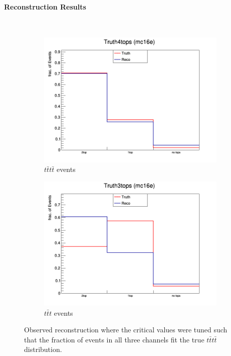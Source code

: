 \newpage

\paragraph{Reconstruction Results} \mbox{} \\


\begin{figure}[H]
\begin{subfigure}{.5\textwidth}
  \centering
  \includegraphics[width=.99\linewidth]{figs/HadTop/4topResult}
  \caption{$t\bar{t}t\bar{t}$ events}
  \label{fig:Reco4t}
\end{subfigure}%
\begin{subfigure}{.5\textwidth}
  \centering
  \includegraphics[width=.99\linewidth]{figs/HadTop/3topsResult}
  \caption{$t\bar{t}t$ events}
  \label{fig:Reco3t}
\end{subfigure}
\caption{Observed reconstruction where the critical values were tuned such that the fraction of events in all three channels fit the true $t\bar{t}t\bar{t}$ distribution.}
\label{fig:RecoResult}
\end{figure}

